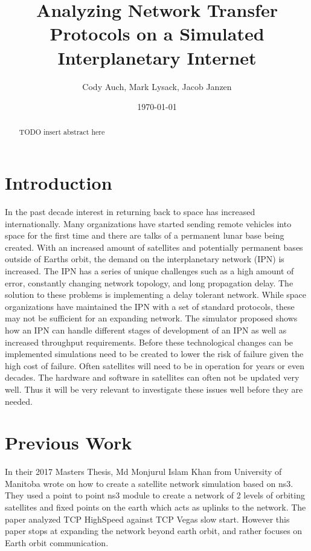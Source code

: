 \documentclass[a4paper,12pt]{article}
\title{Analyzing Network Transfer Protocols on a Simulated Interplanetary Internet}
\author{Cody Auch, Mark Lysack, Jacob Janzen}
\date{\today}
\begin{document}
\maketitle

\begin{abstract}
    TODO insert abstract here
\end{abstract}

\section{Introduction}

In the past decade interest in returning back to space has increased internationally. Many organizations 
have started sending remote vehicles into space for the first time \cite{(indian space program, spaceX, ect)}
and there are talks of a permanent lunar base being created. With an increased amount of satellites and potentially 
permanent bases outside of Earths orbit, the demand on the interplanetary network (IPN) is increased. The IPN has a 
series of unique challenges such as a high amount of error, constantly changing network topology, and long 
propagation delay. The solution to these problems is implementing a delay tolerant network. While space organizations 
have maintained the IPN with a set of standard protocols, these may not be sufficient for an expanding network.
The simulator proposed shows how an IPN can handle different stages of development of an IPN as well as increased 
throughput requirements. Before these technological changes can be implemented simulations need to be created to 
lower the risk of failure given the high cost of failure. Often satellites will need to be in operation for years 
or even decades. The hardware and software in satellites can often not be updated very well. Thus it will be very 
relevant to investigate these issues well before they are needed. 


\section{Previous Work}

In their 2017 Masters Thesis, Md Monjurul Islam Khan \cite{Khan2017} from University of Manitoba wrote on how 
to create a satellite network
simulation based on ns3. They used a point to point ns3 module to create a network of 2 levels of orbiting 
satellites and fixed points on the earth which acts as uplinks to the network. The paper analyzed TCP 
HighSpeed against TCP Vegas slow start. However this paper stops at expanding the network beyond earth orbit, 
and rather focuses on Earth orbit communication.  
\end{document}
